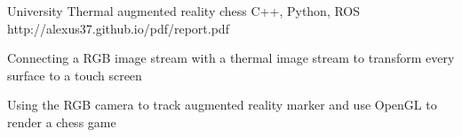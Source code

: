 \begin{cventries}
  \cventry
    {University}
    {Thermal augmented reality chess} %
    {C++, Python, ROS} %
    {http://alexus37.github.io/pdf/report.pdf} %
    {
      \begin{cvitems} %
        \item Connecting a RGB image stream with a thermal image stream to transform every surface to a touch screen
        \item Using the RGB camera to track augmented reality marker and use OpenGL to render a chess game
      \end{cvitems}
    }
\end{cventries}
